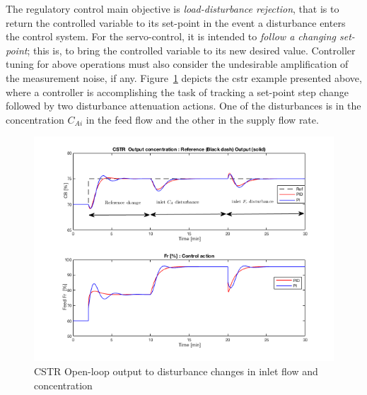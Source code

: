 The regulatory control main objective is \emph{load-disturbance rejection}, that is to return the controlled variable to its set-point in the event a disturbance enters the control system.  For the servo-control, it is intended to \emph{follow a changing set-point}; this is, to bring the controlled variable to its new desired value. Controller tuning for above operations must also consider the undesirable amplification of the measurement noise, if any.  Figure~\ref{Ch2fig:CSTRFigureClosedLoop} depicts the \gls{cstr} example presented above, where a controller is accomplishing the task of tracking a set-point step change followed by two disturbance attenuation actions. One of the disturbances is in the concentration $C_{Ai}$ in the feed flow and the other in the supply flow rate.
%
\begin{figure}[tb]
\centering
\includegraphics[width=\linewidth]{../figuras/Ch2FigureClosedLoop}
\caption{CSTR Open-loop output to disturbance changes in inlet flow and concentration} 
\label{Ch2fig:CSTRFigureClosedLoop}
\end{figure}
%
%

